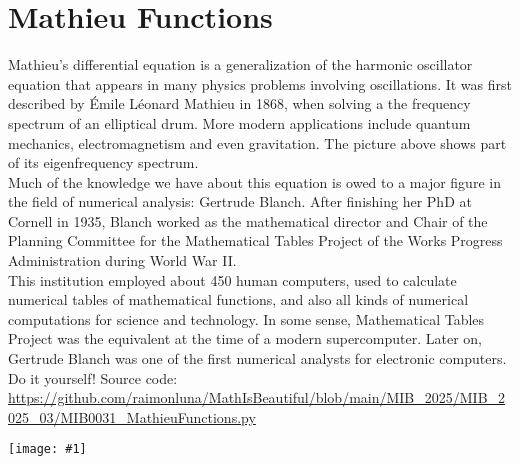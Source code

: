 \documentclass[12pt,landscape]{article}
\newcommand{\artpage}[3][]{%
  \begin{minipage}[t]{0.48\linewidth}
    \vspace{0pt} %
    \section*{#2} %
    \addcontentsline{toc}{section}{#2} %
    #3 %
  \end{minipage}%
  \hfill
  \begin{minipage}[t]{0.48\linewidth}
    \vspace{0pt} %
    \centering
    \texttt{[image: \#1]}
  \end{minipage}%
  \newpage
}
\begin{document}
\artpage[../Output/LowQuality/MIB0031_MathieuFunctions.png]{Mathieu Functions}{%
Mathieu's differential equation is a generalization of the harmonic oscillator equation that appears in many physics problems involving oscillations. It was first described by  Émile Léonard Mathieu in 1868, when solving a the frequency spectrum of an elliptical drum. More modern applications include quantum mechanics, electromagnetism and even gravitation. The picture above shows part of its eigenfrequency spectrum.\\

Much of the knowledge we have about this equation is owed to a major figure in the field of numerical analysis: Gertrude Blanch. After finishing her PhD at Cornell in 1935, Blanch worked as the mathematical director and Chair of the Planning Committee for the Mathematical Tables Project of the Works Progress Administration during World War II.\\

This institution employed about 450 human computers, used to calculate numerical tables of mathematical functions, and also all kinds of numerical computations for science and technology. In some sense, Mathematical Tables Project was the equivalent at the time of a modern supercomputer. Later on, Gertrude Blanch was one of the first numerical analysts for electronic computers.\\

Do it yourself! Source code: \url{https://github.com/raimonluna/MathIsBeautiful/blob/main/MIB_2025/MIB_2025_03/MIB0031_MathieuFunctions.py}
}
\end{document}
